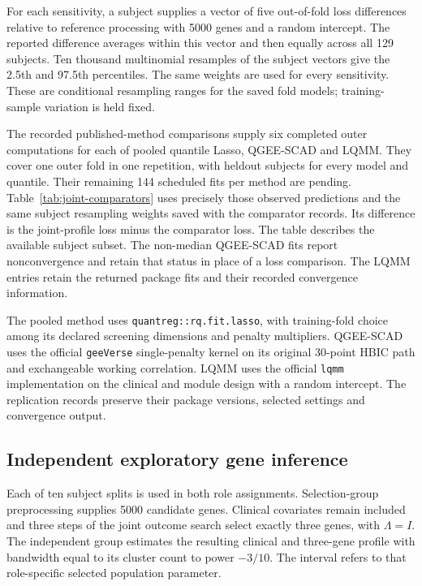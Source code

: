 For each sensitivity, a subject supplies a vector of five
out-of-fold loss differences relative to reference processing with
5000 genes and a random intercept. The reported difference averages
within this vector and then equally across all 129 subjects.
Ten thousand multinomial resamples of the subject vectors give
the 2.5th and 97.5th percentiles. The same weights are used for
every sensitivity. These are conditional resampling ranges for the
saved fold models; training-sample variation is held fixed.

\begingroup\small

\endgroup

The recorded published-method comparisons supply six completed
outer computations for each of pooled quantile Lasso, QGEE-SCAD and LQMM.
They cover one outer fold in one repetition, with
\JointComparatorSubjects{} heldout
subjects for every model and quantile. Their remaining 144
scheduled fits per method are pending. Table~\ref{tab:joint-comparators}
uses precisely those observed predictions and the same subject
resampling weights saved with the comparator records. Its
difference is the joint-profile loss minus the comparator loss.
The table describes the available subject subset.
The \JointComparatorUnconverged{} non-median QGEE-SCAD fits report
nonconvergence and retain that status in place of a loss comparison.
The LQMM entries retain the returned package fits and their
recorded convergence information.

The pooled method uses \texttt{quantreg::rq.fit.lasso}, with
training-fold choice among its declared screening dimensions and
penalty multipliers. QGEE-SCAD uses the official
\texttt{geeVerse} single-penalty kernel on its original 30-point
HBIC path and exchangeable working correlation. LQMM uses the
official \texttt{lqmm} implementation on the clinical and module
design with a random intercept. The replication records preserve
their package versions, selected settings and convergence output.

\begingroup\small

\endgroup

\subsection{Independent exploratory gene inference}

Each of ten subject splits is used in both role assignments.
Selection-group preprocessing supplies 5000 candidate genes.
Clinical covariates remain included and three steps of the joint
outcome search select exactly three genes, with $\Lambda=I$.
The independent group estimates the resulting clinical and
three-gene profile with bandwidth equal to its cluster count to
power $-3/10$. The interval refers to that role-specific selected
population parameter.

